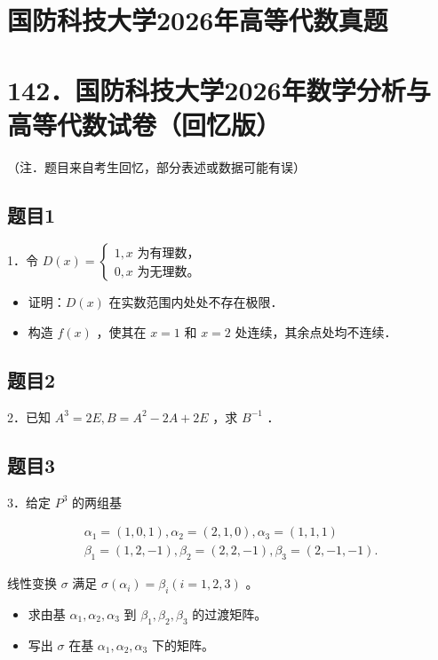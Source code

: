 \documentclass{article}
\begin{document}
\section*{国防科技大学2026年高等代数真题}
\section*{142．国防科技大学2026年数学分析与高等代数试卷（回忆版）}
（注．题目来自考生回忆，部分表述或数据可能有误）

\subsection{题目1}
1．令 \(D(x)=\left\{\begin{array}{l}1, x \text { 为有理数，} \\ 0, x \text { 为无理数。 }\end{array}\right.\)

\begin{itemize}
  \item[（1）] 证明：\(D(x)\) 在实数范围内处处不存在极限．
  \item[（2）] 构造 \(f(x)\) ，使其在 \(x=1\) 和 \(x=2\) 处连续，其余点处均不连续．
\end{itemize}

\subsection{题目2}
2．已知 \(A^{3}=2 E, B=A^{2}-2 A+2 E\) ，求 \(B^{-1}\) ．

\subsection{题目3}
3．给定 \(P^{3}\) 的两组基

\[
\begin{gathered}
\alpha_{1}=(1,0,1), \alpha_{2}=(2,1,0), \alpha_{3}=(1,1,1) \\
\beta_{1}=(1,2,-1), \beta_{2}=(2,2,-1), \beta_{3}=(2,-1,-1) .
\end{gathered}
\]

线性变换 \(\sigma\) 满足 \(\sigma\left(\alpha_{i}\right)=\beta_{i}(i=1,2,3)\) 。

\begin{itemize}
  \item[（1）] 求由基 \(\alpha_{1}, \alpha_{2}, \alpha_{3}\) 到 \(\beta_{1}, \beta_{2}, \beta_{3}\) 的过渡矩阵。
  \item[（2）] 写出 \(\sigma\) 在基 \(\alpha_{1}, \alpha_{2}, \alpha_{3}\) 下的矩阵。
\end{itemize}
\end{document}
